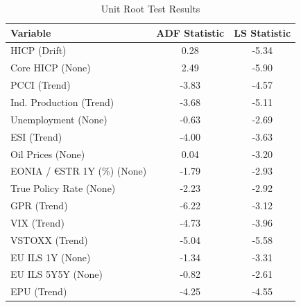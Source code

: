 \begin{table}[ht]
\centering
\begin{tabular}{lcc}
  \hline
Variable & ADF Statistic & LS Statistic \\ 
  \hline
HICP (Drift) & 0.28 & -5.34 \\ 
  Core HICP (None) & 2.49 & -5.90 \\ 
  PCCI (Trend) & -3.83 & -4.57 \\ 
  Ind. Production (Trend) & -3.68 & -5.11 \\ 
  Unemployment (None) & -0.63 & -2.69 \\ 
  ESI (Trend) & -4.00 & -3.63 \\ 
  Oil Prices (None) & 0.04 & -3.20 \\ 
  EONIA / €STR 1Y (\%) (None) & -1.79 & -2.93 \\ 
  True Policy Rate (None) & -2.23 & -2.92 \\ 
  GPR (Trend) & -6.22 & -3.12 \\ 
  VIX (Trend) & -4.73 & -3.96 \\ 
  VSTOXX (Trend) & -5.04 & -5.58 \\ 
  EU ILS 1Y (None) & -1.34 & -3.31 \\ 
  EU ILS 5Y5Y (None) & -0.82 & -2.61 \\ 
  EPU (Trend) & -4.25 & -4.55 \\ 
   \hline
\end{tabular}
\caption{Unit Root Test Results} 
\label{tab:unit_roots}
\end{table}
